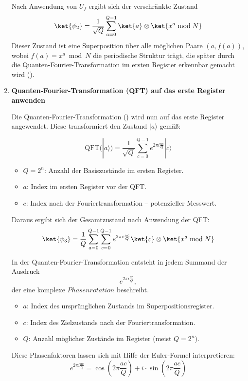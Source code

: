 \begin{enumerate}
Nach Anwendung von \( U_f \) ergibt sich der verschränkte Zustand
\[
\ket{\psi_2} = \frac{1}{\sqrt{Q}} \sum_{a=0}^{Q-1} \ket{a} \otimes \ket{x^a \bmod N}
\]
Dieser Zustand ist eine Superposition über alle möglichen Paare \( (a, f(a)) \), wobei \( f(a) = x^a \bmod N \) die periodische Struktur trägt, die später durch die Quanten-Fourier-Transformation im ersten Register erkennbar gemacht wird (\cite[16]{shor_polynomial-time_1994}).\\

\item \textbf{Quanten-Fourier-Transformation (QFT) auf das erste Register anwenden}

\noindent Die Quanten-Fourier-Transformation (\cite[13-15,17]{shor_polynomial-time_1994}) wird nun auf das erste Register angewendet. Diese transformiert den Zustand \( |a\rangle \) gemäß:

\[
\mathrm{QFT}(|a\rangle) = \frac{1}{\sqrt{Q}} \sum_{c=0}^{Q-1} e^{2\pi i \frac{a c}{Q}} |c\rangle
\]

\begin{itemize}
    \item \( Q = 2^n \): Anzahl der Basiszustände im ersten Register.
    \item \( a \): Index im ersten Register vor der QFT.
    \item \( c \): Index nach der Fouriertransformation – potenzieller Messwert.
\end{itemize}

\noindent Daraus ergibt sich der Gesamtzustand nach Anwendung der QFT:
\[
\ket{\psi_3} = \frac{1}{Q} \sum_{a=0}^{Q-1} \sum_{c=0}^{Q-1} e^{2\pi i \frac{a c}{Q}} \ket{c} \otimes \ket{x^a \bmod N}
\]

\noindent In der Quanten-Fourier-Transformation entsteht in jedem Summand der Ausdruck
\[
e^{2\pi i \frac{a c}{Q}},
\]
der eine komplexe \(Phasenrotation\) beschreibt.

\begin{itemize}
    \item \textbf{\( a \)}: Index des ursprünglichen Zustands im Superpositionsregister.
    \item \textbf{\( c \)}: Index des Zielzustands nach der Fouriertransformation.
    \item \textbf{\( Q \)}: Anzahl möglicher Zustände im Register (meist \( Q = 2^n \)).
\end{itemize}

\noindent Diese Phasenfaktoren lassen sich mit Hilfe der Euler-Formel interpretieren:
\[
e^{2\pi i \frac{a c}{Q}} = \cos\left(2\pi \frac{a c}{Q}\right) + i \cdot \sin\left(2\pi \frac{a c}{Q}\right)
\]


\end{enumerate}
